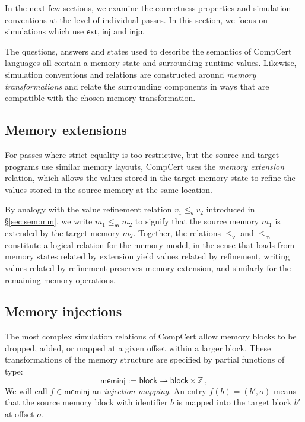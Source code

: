 \documentclass[acmsmall,screen,review,anonymous]{acmart}
\newcommand{\kw}[1]{\ensuremath{ \mathsf{#1} }}
\newcommand{\vref}{\le_\kw{v}}
\newcommand{\mext}{\le_\kw{m}}
\begin{document}
In the next few sections,
we examine the correctness properties
and simulation conventions
at the level of individual passes.
In this section,
we focus on simulations which use
$\kw{ext}$, $\kw{inj}$ and $\kw{injp}$.

The questions, answers and states
used to describe the semantics of CompCert languages all contain
a memory state and surrounding runtime values.
Likewise, simulation conventions and relations
are constructed around \emph{memory transformations}
and relate the surrounding components in ways that %
are compatible with the chosen memory transformation.

\subsection{Memory extensions} \label{sec:memext} %

For passes where strict equality is too restrictive,
but the source and target programs
use similar memory layouts,
CompCert uses the \emph{memory extension} relation,
which allows the values
stored in the target memory state to refine
the values stored in the source memory at the same location.

By analogy with
the value refinement relation $v_1 \vref v_2$
introduced in \S\ref{sec:sem:mm},
we write $m_1 \mext m_2$ to signify that
the source memory $m_1$ is extended by
the target memory $m_2$.
Together,
the relations $\vref$ and $\mext$
constitute a logical relation for the memory model,
in the sense that
loads from memory states related by extension
yield values related by refinement,
writing values related by refinement
preserves memory extension,
and similarly for the remaining memory operations.


\subsection{Memory injections} \label{sec:meminj} %

The most complex simulation relations of CompCert
allow memory blocks to be dropped, added, or
mapped at a given offset within a larger block.
These transformations of the memory structure
are specified by partial functions of type:
\[
  \kw{meminj} := \kw{block} \rightharpoonup \kw{block} \times \mathbb{Z} \,,
\]
We will call $f \in \kw{meminj}$
an \emph{injection mapping}.
An entry $f(b) = (b', o)$
means that the source memory block with identifier $b$
is mapped into the target block $b'$
at offset $o$.
\end{document}
